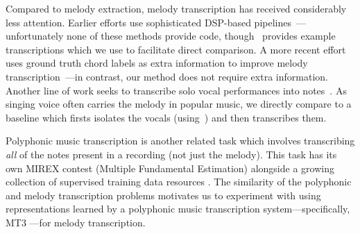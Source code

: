 Compared to melody extraction, melody transcription has received considerably less attention. 
Earlier efforts use sophisticated DSP-based pipelines~\cite{paiva2004auditory,paiva2005detection,ryynanen2008automatic,weil2009automatic}---unfortunately none of these methods provide code, though~\cite{ryynanen2008automatic} provides example transcriptions which we use to facilitate direct comparison. 
A more recent effort uses ground truth chord labels as extra information to improve melody transcription~\cite{laaksonen2014automatic}---in contrast, our method does not require extra information. 
Another line of work seeks to transcribe solo vocal performances into notes~\cite{mauch2015computer,nishikimi2020bayesian,nishikimi2021audio}. 
As singing voice often carries the melody in popular music, we directly compare to a baseline which firsts isolates the vocals (using~\cite{hennequin2020spleeter}) and then transcribes them.

Polyphonic music transcription is another related task which involves transcribing \emph{all} of the notes present in a recording (not just the melody).
This task has its own MIREX contest (Multiple Fundamental \fnot{} Estimation) alongside a growing collection of supervised training data resources \cite{benetos2013automatic,thickstun2017learning,hawthorne2019enabling,manilow2019cutting}. 
The similarity of the polyphonic and melody transcription problems motivates us to
experiment with using representations learned by a polyphonic music transcription system---specifically, MT3 \cite{gardner2021mt3}---for melody transcription.